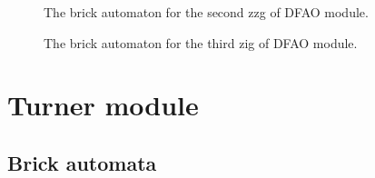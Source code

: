 \documentclass[runningheads]{llncs}
\begin{document}
\begin{figure}[ht]
\centering
\caption{The brick automaton for the second zzg of DFAO module.}
\label{fig:brick_automaton_Dzag2}
\end{figure}

\begin{figure}[ht]
\centering
\caption{The brick automaton for the third zig of DFAO module.}
\label{fig:brick_automaton_Dzig3}
\end{figure}

	\section{Turner module}
	\label{ap_sect:Turner_module}

	\subsection{Brick automata}
	\label{ap_subsect:Turner_module_BA}
\end{document}
